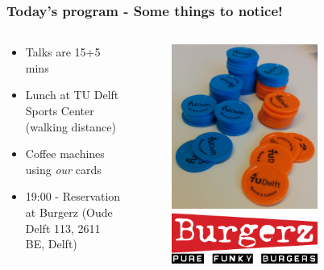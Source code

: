 \documentclass{beamer}
\begin{document}
\begin{frame}
 \frametitle{Today's program - Some things to notice!}
 \begin{columns}
 \begin{column}{0.6\textwidth}
 \begin{itemize}
  \item Talks are {\color{tudblue}15+5 mins}
  \item {\color{tudblue}Lunch} at TU Delft Sports Center (walking distance)
  \item {\color{tudblue}Coffee} machines using \textit{our} cards
  \item 19:00 - Reservation at {\color{tudblue}Burgerz} (Oude Delft 113, 2611 BE, Delft)
 \end{itemize}

 \end{column}

 \begin{column}{0.4\textwidth}
  \begin{figure}[t]
  \includegraphics[width=0.7\textwidth]{pics/money.jpg}\\ \vspace{0.6cm}
  \includegraphics[width=0.7\textwidth]{pics/logo.png}
  \end{figure}
 \end{column}
 \end{columns}
\end{frame}
\end{document}
